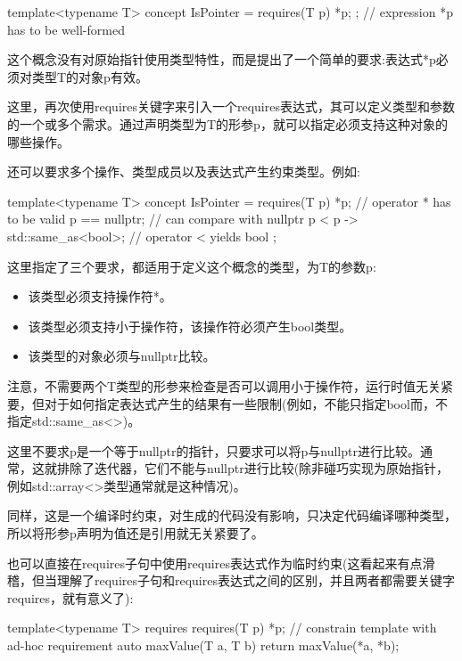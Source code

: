 \begin{cpp}
template<typename T>
concept IsPointer = requires(T p) { *p; }; // expression *p has to be well-formed
\end{cpp}

这个概念没有对原始指针使用类型特性，而是提出了一个简单的要求:表达式*p必须对类型T的对象p有效。

这里，再次使用requires关键字来引入一个requires表达式，其可以定义类型和参数的一个或多个需求。通过声明类型为T的形参p，就可以指定必须支持这种对象的哪些操作。

还可以要求多个操作、类型成员以及表达式产生约束类型。例如:

\begin{cpp}
template<typename T>
concept IsPointer = requires(T p) {
	*p; // operator * has to be valid
	p == nullptr; // can compare with nullptr
	{p < p} -> std::same_as<bool>; // operator < yields bool
};
\end{cpp}

这里指定了三个要求，都适用于定义这个概念的类型，为T的参数p:

\begin{itemize}
\item
该类型必须支持操作符*。

\item
该类型必须支持小于操作符，该操作符必须产生bool类型。

\item
该类型的对象必须与nullptr比较。
\end{itemize}

注意，不需要两个T类型的形参来检查是否可以调用小于操作符，运行时值无关紧要，但对于如何指定表达式产生的结果有一些限制(例如，不能只指定bool而，不指定std::same\_as<>)。

这里不要求p是一个等于nullptr的指针，只要求可以将p与nullptr进行比较。通常，这就排除了迭代器，它们不能与nullptr进行比较(除非碰巧实现为原始指针，例如std::array<>类型通常就是这种情况)。

同样，这是一个编译时约束，对生成的代码没有影响，只决定代码编译哪种类型，所以将形参p声明为值还是引用就无关紧要了。

也可以直接在requires子句中使用requires表达式作为临时约束(这看起来有点滑稽，但当理解了requires子句和requires表达式之间的区别，并且两者都需要关键字requires，就有意义了):

\begin{cpp}
template<typename T>
requires requires(T p) { *p; } // constrain template with ad-hoc requirement
auto maxValue(T a, T b)
{
	return maxValue(*a, *b);
}
\end{cpp}

